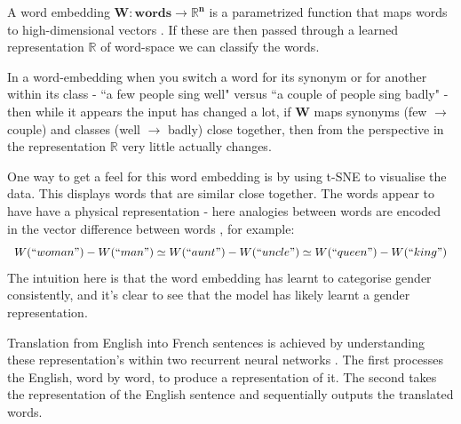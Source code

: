 \documentclass[a4paper,11pt,titlepage]{article}
\begin{document}
 		
		A word embedding $ \bm{W : words \rightarrow \mathbb{R}^{n}} $ is a parametrized function that maps words to high-dimensional vectors \cite{Bengio2003}. If these are then passed through a learned representation $ \mathbb{R} $ of word-space we can classify the words.  		
		\par 
		In a word-embedding when you switch a word for its synonym or for another within its class - ``a few people sing well" versus ``a couple of people sing badly" - then while it appears the input has changed a lot, if $ \bm{W} $ maps synonyms (few $\rightarrow$ couple) and classes (well $\rightarrow$ badly) close together, then from the perspective in the representation $ \mathbb{R} $ very little actually changes.
		\par 

 		 \begin{figure}[H]
    			\caption{}%
    			\label{fig:words}
		\end{figure}
		
		One way to get a feel for this word embedding is by using t-SNE to visualise the data. This displays words that are similar close together. The words appear to have have a physical representation - here analogies between words are encoded in the vector difference between words \cite{Olah2014c}, for example:
		$$
		W(``woman") - W(``man") \simeq W(``aunt") - W(``uncle") \simeq W(``queen") - W(``king")
		$$
		The intuition here is that the word embedding has learnt to categorise gender consistently, and it's clear to see that the model has likely learnt a gender representation.
 		\par  		
		 Translation from English into French sentences is achieved by understanding these representation's within two recurrent neural networks \cite{Sutskever2014} . The first processes the English, word by word, to produce a representation of it. The second takes the representation of the English sentence and sequentially outputs the translated words.
\end{document}
